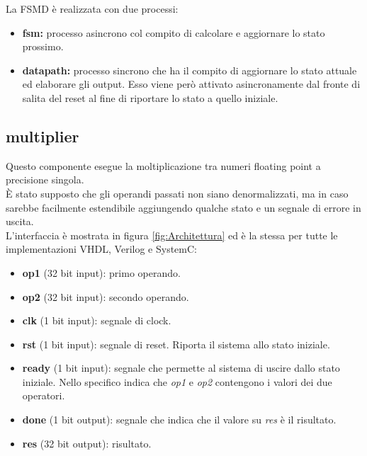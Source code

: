 \documentclass[]{IEEEtran}
\begin{document}
La FSMD è realizzata con due processi:
\begin{itemize}
    \item \textbf{fsm:} processo asincrono col compito di calcolare e aggiornare lo stato prossimo.
    \item \textbf{datapath:} processo sincrono che ha il compito di aggiornare lo stato attuale ed elaborare gli output. Esso viene però attivato asincronamente dal fronte di salita del reset al fine di riportare lo stato a quello iniziale.
\end{itemize}


\subsection{multiplier}
Questo componente esegue la moltiplicazione tra numeri floating point a precisione singola. 
\\È stato supposto che gli operandi passati non siano denormalizzati, ma in caso sarebbe facilmente estendibile aggiungendo qualche stato e un segnale di errore in uscita.
\\L'interfaccia è mostrata in figura \ref{fig:Architettura} ed è la stessa per tutte le implementazioni VHDL, Verilog e SystemC: 
\begin{itemize}
    \item \textbf{op1} (32 bit input): primo operando.
    \item \textbf{op2} (32 bit input): secondo operando.
    \item \textbf{clk} (1 bit input): segnale di clock.
    \item \textbf{rst} (1 bit input): segnale di reset. Riporta il sistema allo stato iniziale.
    \item \textbf{ready} (1 bit input): segnale che permette al sistema di uscire dallo stato iniziale. Nello specifico indica che \textit{op1} e \textit{op2} contengono i valori dei due operatori.
    \item \textbf{done} (1 bit output): segnale che indica che il valore su \textit{res} è il risultato.
    \item \textbf{res} (32 bit output): risultato.
\end{itemize}
    
\end{document}
